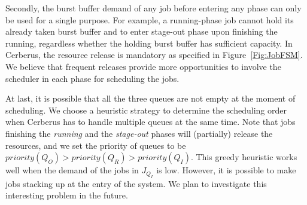 Secondly,  the burst buffer demand of any job before entering any phase can only be used for a single purpose.
For example, a running-phase job cannot hold its already taken burst buffer
and to enter stage-out phase upon finishing the running, regardless whether the holding burst buffer has sufficient capacity.
In Cerberus, the resource release is mandatory as specified in Figure~\ref{Fig:JobFSM}.
We believe that frequent releases provide more opportunities to involve the scheduler in each phase for scheduling the jobs.

At last, it is possible that all the three queues are not empty at the moment of scheduling.
We choose a heuristic strategy to determine the scheduling order when
Cerberus has to handle multiple queues at the same time.
Note that jobs finishing the \textit{running} and the \textit{stage-out} phases
will (partially) release the resources, and we set the priority of queues to be $priority(Q_O) > priority(Q_R) > priority(Q_I)$.
This greedy heuristic works well when the demand of the jobs in $J_{Q_I}$ is low.
However, it is possible to make jobs stacking up at the entry of the system.
We plan to investigate this interesting problem in the future.



